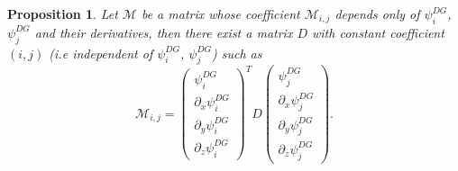 \documentclass[a4paper, 11pt]{report}
\newtheorem{Proposition}{Proposition}
\begin{document}
\begin{Proposition}
Let $\mathscr{M}$ be a matrix whose coefficient $\mathscr{M}_{i,j}$ depends only of $\psi^{DG}_i$, $\psi^{DG}_j$ and their derivatives, then there exist a matrix $D$ with constant coefficient $(i,j)$ (\textit{i.e} independent of $\psi^{DG}_i$, $\psi^{DG}_j$) such  as
\begin{equation*}
\mathscr{M}_{i,j}=\begin{pmatrix}\psi^{DG}_i \\ \partial_x \psi^{DG}_i \\ \partial_y\psi^{DG}_i \\ \partial_z \psi^{DG}_i \end{pmatrix}^{T}D\begin{pmatrix}\psi^{DG}_j \\ \partial_x \psi^{DG}_j \\ \partial_y\psi^{DG}_j \\ \partial_z \psi^{DG}_j \end{pmatrix}.
\end{equation*}
\end{Proposition}
\end{document}
